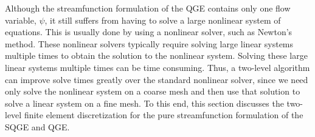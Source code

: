 Although the streamfunction formulation of the QGE contains only one flow
variable, $\psi$, it still suffers from having to solve a large nonlinear system
of equations. This is usually done by using a nonlinear solver, such as Newton's
method. These nonlinear solvers typically require solving large linear systems
multiple times to obtain the solution to the nonlinear system. Solving these
large linear systems multiple times can be time consuming. Thus, a two-level
algorithm can improve solve times greatly over the standard nonlinear solver,
since we need only solve the nonlinear system on a coarse mesh and then use that
solution to solve a linear system on a fine mesh. To this end, this section
discusses the two-level finite element discretization for the pure
streamfunction formulation of the SQGE and QGE.
